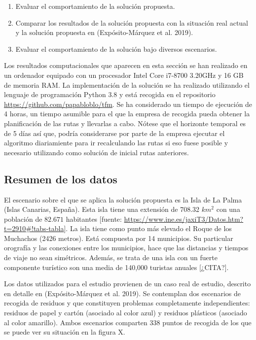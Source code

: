 \documentclass[
]{article}
\providecommand{\tightlist}{%
  \setlength{\itemsep}{0pt}\setlength{\parskip}{0pt}}
\begin{document}
\begin{enumerate}
\def\labelenumi{\arabic{enumi}.}
\tightlist
\item
  Evaluar el comportamiento de la solución propuesta.
\item
  Comparar los resultados de la solución propuesta con la situación real
  actual y la solución propuesta en (Expósito-Márquez et al. 2019).
\item
  Evaluar el comportamiento de la solución bajo diversos escenarios.
\end{enumerate}

Los resultados computacionales que aparecen en esta sección se han
realizado en un ordenador equipado con un procesador Intel Core i7-8700
3.20GHz y 16 GB de memoria RAM. La implementación de la solución se ha
realizado utilizando el lenguaje de programación Python 3.8 y está
recogida en el repositorio \url{https://github.com/papabloblo/tfm}. Se
ha considerado un tiempo de ejecución de 4 horas, un tiempo asumible
para el que la empresa de recogida pueda obtener la planificación de las
rutas y llevarlas a cabo. Nótese que el horizonte temporal es de 5 días
así que, podría considerarse por parte de la empresa ejecutar el
algoritmo diariamiente para ir recalculando las rutas si eso fuese
posible y necesario utilizando como solución de inicial rutas
anteriores.

\hypertarget{resumen-de-los-datos}{%
\subsection{Resumen de los datos}\label{resumen-de-los-datos}}

El escenario sobre el que se aplica la solución propuesta es la Isla de
La Palma (Islas Canarias, España). Esta isla tiene una extensión de
708.32 \(km^2\) con una población de \(82.671\) habitantes {[}fuente:
\url{https://www.ine.es/jaxiT3/Datos.htm?t=2910\#!tabs-tabla}{]}. La
isla tiene como punto más elevado el Roque de los Muchachos (2426
metros). Está compuesta por 14 municipios. Su particular orografía y las
conexiones entre los municipios, hace que las distancias y tiempos de
viaje no sean simétricos. Además, se trata de una isla con un fuerte
componente turístico son una media de 140,000 turistas anuales
{[}¿CITA?{]}.

Los datos utilizados para el estudio provienen de un caso real de
estudio, descrito en detalle en (Expósito-Márquez et al. 2019). Se
contemplan dos escenarios de recogida de residuos y que constituyen
problemas completamente independientes: residuos de papel y cartón
(asociado al color azul) y residuos plásticos (asociado al color
amarillo). Ambos escenarios comparten 338 puntos de recogida de los que
se puede ver su situación en la figura X.
\end{document}
